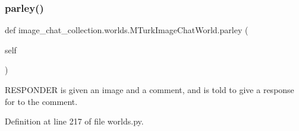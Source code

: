 \subsubsection{\texorpdfstring{parley()}{parley()}}
{\footnotesize\ttfamily def image\+\_\+chat\+\_\+collection.\+worlds.\+M\+Turk\+Image\+Chat\+World.\+parley (\begin{DoxyParamCaption}\item[{}]{self }\end{DoxyParamCaption})}

\begin{DoxyVerb}RESPONDER is given an image and a comment, and is told to give a response for to
the comment.
\end{DoxyVerb}
 

Definition at line 217 of file worlds.\+py.


